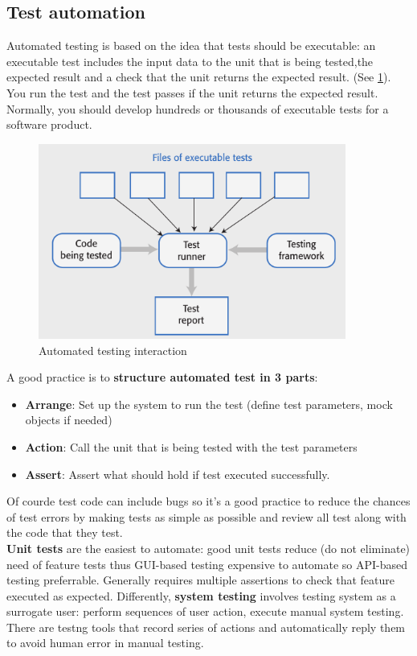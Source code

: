 \documentclass[10pt,a4paper]{report}
\begin{document}
\subsection{Test automation}
Automated testing is based on the idea that tests should be executable: an executable test includes the input data to the unit that is being tested,the expected result and a check that the unit returns the expected result. (See \ref{image107}). 
You run the test and the test passes if the unit returns the expected
result. Normally, you should develop hundreds or thousands of executable tests for a software product.
\begin{figure}[h]
	\centering
	\includegraphics[width=0.9\textwidth]{image107}
	\caption{Automated testing interaction}
	\label{image107}
\end{figure} 
A good practice is to \textbf{structure automated test in 3 parts}:
\begin{itemize}
	\item \textbf{Arrange}: Set up the system to run the test (define test parameters, mock objects if needed)
	\item \textbf{Action}: Call the unit that is being tested with the test parameters
	\item \textbf{Assert}: Assert what should hold if test executed successfully.
\end{itemize}
Of courde test code can include bugs so it's a good practice to reduce the chances of test errors by making tests as simple as possible and review all test along with the code that they test. \\
\textbf{Unit tests} are the easiest to automate: good unit tests reduce (do not eliminate) need of feature tests thus GUI-based testing expensive to automate so API-based testing preferrable. Generally requires multiple assertions to check that feature executed as expected. 
Differently, \textbf{system testing} involves testing system as a surrogate user: perform sequences of user action, execute manual system testing. There are testng tools that record series of actions and automatically reply them to avoid human error in manual testing. 
\end{document}
